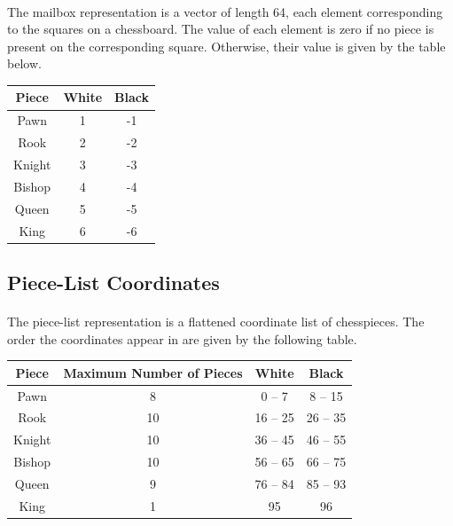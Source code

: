 \documentclass[12pt,a4paper]{book}
\begin{document}
\paragraph{} The mailbox representation is a vector of length 64, each element corresponding to the squares on a chessboard. The value of each element is zero if no piece is present on the corresponding square. Otherwise, their value is given by the table below.

\begin{center}
  \begin{tabular}{ c | c  c }
    \hline
    \textbf{Piece} & \textbf{White} & \textbf{Black} \\ \hline
    Pawn & 1 & -1 \\
    Rook & 2 & -2 \\
    Knight & 3 & -3 \\
    Bishop & 4 & -4 \\
    Queen & 5 & -5 \\
    King & 6 & -6 \\
    \hline
  \end{tabular}
\end{center}

\subsection{Piece-List Coordinates}

\paragraph{} The piece-list representation is a flattened coordinate list of chesspieces. The order the coordinates appear in are given by the following table.

\begin{center}
  \begin{tabular}{c | c c c }
    \hline
    \textbf{Piece} & \textbf{Maximum Number of Pieces} & \textbf{White} & \textbf{Black} \\ \hline
    Pawn & 8 & 0 -- 7 & 8 -- 15 \\
    Rook & 10 & 16 -- 25 & 26 -- 35 \\
    Knight & 10 & 36 -- 45 & 46 -- 55 \\
    Bishop & 10 & 56 -- 65 & 66 -- 75 \\
    Queen & 9 & 76 -- 84 & 85 -- 93 \\
    King & 1 & 95 & 96 \\
    \hline
  \end{tabular}
\end{center}
\end{document}

